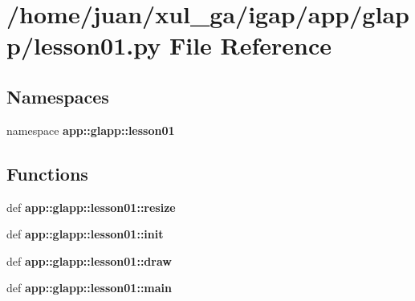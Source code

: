 \section{/home/juan/xul\_\-ga/igap/app/glapp/lesson01.py File Reference}
\label{lesson01_8py}
\subsection*{Namespaces}
\begin{CompactItemize}
\item 
namespace {\bf app::glapp::lesson01}
\end{CompactItemize}
\subsection*{Functions}
\begin{CompactItemize}
\item 
def {\bf app::glapp::lesson01::resize}
\item 
def {\bf app::glapp::lesson01::init}
\item 
def {\bf app::glapp::lesson01::draw}
\item 
def {\bf app::glapp::lesson01::main}
\end{CompactItemize}
